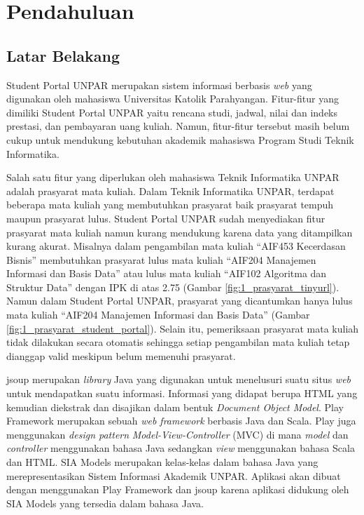 \chapter{Pendahuluan}
\label{chap:pendahuluan}

\section{Latar Belakang}
\label{sec:latar_belakang}

Student Portal UNPAR\cite{studentportalunpar} merupakan sistem informasi berbasis \textit{web} yang digunakan oleh mahasiswa Universitas Katolik Parahyangan. Fitur-fitur yang dimiliki Student Portal UNPAR yaitu rencana studi, jadwal, nilai dan indeks prestasi, dan pembayaran uang kuliah. Namun, fitur-fitur tersebut masih belum cukup untuk mendukung kebutuhan akademik mahasiswa Program Studi Teknik Informatika. 

Salah satu fitur yang diperlukan oleh mahasiswa Teknik Informatika UNPAR adalah prasyarat mata kuliah. Dalam Teknik Informatika UNPAR, terdapat beberapa mata kuliah yang membutuhkan prasyarat baik prasyarat tempuh maupun prasyarat lulus. Student Portal UNPAR sudah menyediakan fitur prasyarat mata kuliah namun kurang mendukung karena data yang ditampilkan kurang akurat. Misalnya dalam pengambilan mata kuliah "`AIF453 Kecerdasan Bisnis"' membutuhkan prasyarat lulus mata kuliah "`AIF204 Manajemen Informasi dan Basis Data"' atau lulus mata kuliah "`AIF102 Algoritma dan Struktur Data"' dengan IPK di atas 2.75 (Gambar \ref{fig:1_prasyarat_tinyurl}). Namun dalam Student Portal UNPAR, prasyarat yang dicantumkan hanya lulus mata kuliah "`AIF204 Manajemen Informasi dan Basis Data"' (Gambar \ref{fig:1_prasyarat_student_portal}). Selain itu, pemeriksaan prasyarat mata kuliah tidak dilakukan secara otomatis sehingga setiap pengambilan mata kuliah tetap dianggap valid meskipun belum memenuhi prasyarat.

jsoup\cite{jsoup} merupakan \textit{library} Java yang digunakan untuk menelusuri suatu situs \textit{web} untuk mendapatkan suatu informasi. Informasi yang didapat berupa HTML yang kemudian diekstrak dan disajikan dalam bentuk \textit{Document Object Model}. Play Framework\cite{Leroux:2014} merupakan sebuah \textit{web framework} berbasis Java dan Scala. Play juga menggunakan \textit{design pattern} \textit{Model-View-Controller} (MVC) di mana \textit{model} dan \textit{controller} menggunakan bahasa Java sedangkan \textit{view} menggunakan bahasa Scala dan HTML. SIA Models\cite{siamodels} merupakan kelas-kelas dalam bahasa Java yang merepresentasikan Sistem Informasi Akademik UNPAR. Aplikasi akan dibuat dengan menggunakan Play Framework dan jsoup karena aplikasi didukung oleh SIA Models yang tersedia dalam bahasa Java. 

